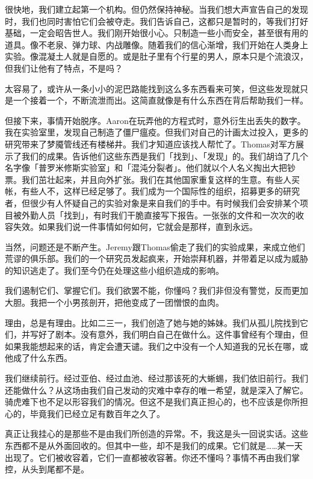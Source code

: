 很快地，我们建立起第一个机构。但仍然保持神秘。当我们想大声宣告自己的发现时，我们也同时害怕它们会被夺走。我们告诉自己，这都只是暂时的，等我们打好基础，一定会昭告世人。我们刚开始很小心。只制造一些小而安全，甚至很有用的道具。像不老泉、弹力球、内战雕像。随着我们的信心渐增，我们开始在人类身上实验。像混凝土人就是自愿的。或是肚子里有个行星的男人，原本只是个流浪汉，但我们让他有了特点，不是吗？

太容易了，或许从一条小小的泥巴路能找到这么多东西看来可笑，但这些发现就只是一个接着一个，不断流泄而出。这简直就像是有什么东西在背后帮助我们一样。

但接下来，事情开始脱序。Aaron在玩弄他的方程式时，意外衍生出丢失的数字。我在实验室里，发现自己制造了僵尸瘟疫。但我们对自己的计画太过投入，更多的研究带来了梦魇管线还有楼梯井。我们才知道应该找人帮忙了。Thomas对军方展示了我们的成果。告诉他们这些东西是我们「找到」、「发现」的。我们胡诌了几个名字像「普罗米修斯实验室」和「混沌分裂者」。他们就以个人名义掏出大把钞票。我们茁壮起来，并且向外扩张。我们在其他国家重复这样的生意。有些人买帐，有些人不，这样已经足够了。我们成为一个国际性的组织，招募更多的研究者，但很少有人怀疑自己的实验对象是来自我们的手中。有时候我们会安排某个项目被外勤人员「找到」，有时我们干脆直接写下报告。一张张的文件和一次次的收容失效。如果我们说一件事情如何如何，它就会是那样，直到永远。

当然，问题还是不断产生。Jeremy跟Thomas偷走了我们的实验成果，来成立他们荒谬的俱乐部。我们的一个研究员发起疯来，开始崇拜机器，并带着足以成为威胁的知识逃走了。我们至今仍在处理这些小组织造成的影响。

我们遏制它们、掌握它们。我们欲罢不能，你懂吗？我们非但没有警觉，反而更加大胆。我把一个小男孩剖开，把他变成了一团憎恨的血肉。

理由，总是有理由。比如二三一，我们创造了她与她的姊妹。我们从孤儿院找到它们，并写好了剧本。没有意外，我们明白自己在做什么。这件事曾经有个理由，但如果我能想起来的话，肯定会遭天谴。我们之中没有一个人知道我的兄长在哪，或他成了什么东西。

我们继续前行。经过亚伯、经过血池、经过那该死的大蜥蜴，我们依旧前行。我们还能做什么？从这场由我们自己发动的灾难中幸存的唯一希望，就是深入了解它。骑虎难下也不足以形容我们的情况。但这不是我们真正担心的，也不应该是你所担心的，毕竟我们已经立足有数百年之久了。

真正让我挂心的是那些不是由我们所创造的异常。不，我这是头一回说实话。这些东西都不是从外面回收的。但其中一些，却不是我们的成果。它们就是……某一天出现了。它们被收容着，它们一直都被收容著。你还不懂吗？事情不再由我们掌控，从头到尾都不是。
